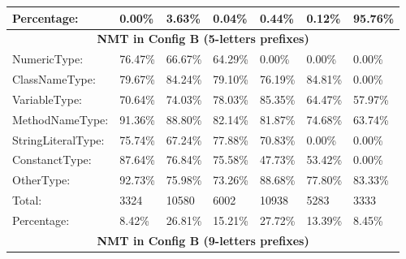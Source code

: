 \begin{table*}[]
\begin{tabular}{|l|l|l|l|l|l|l|}
Percentage:                                & 0.00\%             & 3.63\%             & 0.04\%             & 0.44\%             & 0.12\%             & 95.76\%                   \\ \hline
\multicolumn{7}{|c|}{\textbf{NMT in Config B (5-letters prefixes)}}                                                                                                             \\ \hline
NumericType:                               & 76.47\%            & 66.67\%            & 64.29\%            & 0.00\%             & 0.00\%             & 0.00\%                    \\ \hline
ClassNameType:                             & 79.67\%            & 84.24\%            & 79.10\%            & 76.19\%            & 84.81\%            & 0.00\%                    \\ \hline
VariableType:                              & 70.64\%            & 74.03\%            & 78.03\%            & 85.35\%            & 64.47\%            & 57.97\%                   \\ \hline
MethodNameType:                            & 91.36\%            & 88.80\%            & 82.14\%            & 81.87\%            & 74.68\%            & 63.74\%                   \\ \hline
StringLiteralType:                         & 75.74\%            & 67.24\%            & 77.88\%            & 70.83\%            & 0.00\%             & 0.00\%                    \\ \hline
ConstanctType:                             & 87.64\%            & 76.84\%            & 75.58\%            & 47.73\%            & 53.42\%            & 0.00\%                    \\ \hline
OtherType:                                 & 92.73\%            & 75.98\%            & 73.26\%            & 88.68\%            & 77.80\%            & 83.33\%                   \\ \hline
Total:                                     & 3324               & 10580              & 6002               & 10938              & 5283               & 3333                      \\ \hline
Percentage:                                & 8.42\%             & 26.81\%            & 15.21\%            & 27.72\%            & 13.39\%            & 8.45\%                    \\ \hline
\multicolumn{7}{|c|}{\textbf{NMT in Config B (9-letters prefixes)}}                                                                                                             \\ \hline

\end{tabular}
\end{table*}
